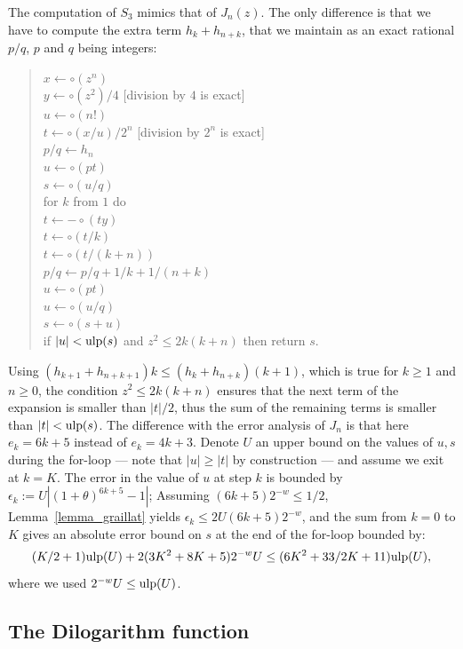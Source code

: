 \documentclass[12pt]{amsart}
\def\q{\hspace*{5mm}}
\def\ulp{{\rm ulp}}
\begin{document}
The computation of $S_3$ mimics that of $J_n(z)$. The only difference is that
we have to compute the extra term $h_k + h_{n+k}$, that we maintain as an
exact rational $p/q$, $p$ and $q$ being integers:
\begin{quote}
$x \leftarrow \circ(z^n)$ \\
$y \leftarrow \circ(z^2)/4$ [division by $4$ is exact] \\
$u \leftarrow \circ(n!)$ \\
$t \leftarrow \circ(x/u)/2^n$ [division by $2^n$ is exact] \\
$p/q \leftarrow h_n$  \\
$u \leftarrow \circ(p t)$ \\
$s \leftarrow \circ(u/q)$ \\
for $k$ from $1$ do \\
\q $t \leftarrow -\circ(ty)$ \\
\q $t \leftarrow \circ(t/k)$ \\
\q $t \leftarrow \circ(t/(k+n))$ \\
\q $p/q \leftarrow p/q + 1/k + 1/(n+k)$ \qquad [exact] \\
\q $u \leftarrow \circ(p t)$ \\
\q $u \leftarrow \circ(u / q)$ \\
\q $s \leftarrow \circ(s+u)$ \\
\q if $|u| < \ulp(s)$ and $z^2 \leq 2k(k+n)$ then return $s$. \\
\end{quote}
Using $(h_{k+1} + h_{n+k+1}) k \leq (h_k + h_{n+k}) (k+1)$, which is true
for $k \geq 1$ and $n \geq 0$,
the condition $z^2 \leq 2k(k+n)$ ensures that the next term
of the expansion is smaller than $|t|/2$, thus the sum of the remaining terms
is smaller than $|t| < \ulp(s)$.
The difference with the error analysis of $J_n$ is that here
$e_k = 6k+5$ instead of $e_k = 4k+3$.
Denote $U$ an upper bound on the
values of $u, s$ during the for-loop --- note that $|u| \geq |t|$ by
construction --- and assume we exit at $k=K$.
The error in the value of $u$ at step $k$ is bounded by
$\epsilon_k := U |(1+\theta)^{6k+5}-1|$;
Assuming $(6k+5) 2^{-w} \leq 1/2$,
Lemma~\ref{lemma_graillat}
yields $\epsilon_k \leq 2 U (6k+5) 2^{-w}$, and the sum from $k=0$ to $K$
gives an absolute error bound on $s$ at the end of the for-loop bounded by:
\[ (K/2+1) \ulp(U) + 2 (3K^2+8K+5) 2^{-w} U \leq (6K^2+33/2K+11) \ulp(U), \]
where we used $2^{-w} U \leq \ulp(U)$.

\subsection{The Dilogarithm function}
\end{document}
